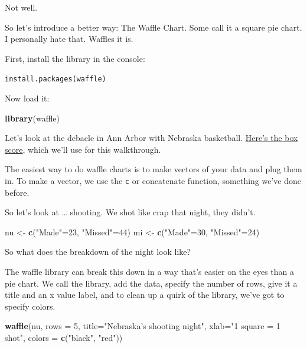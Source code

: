 \documentclass[]{book}
\newenvironment{Shaded}{\begin{snugshade}}{\end{snugshade}}
\newcommand{\KeywordTok}[1]{\textcolor[rgb]{0.13,0.29,0.53}{\textbf{#1}}}
\newcommand{\DataTypeTok}[1]{\textcolor[rgb]{0.13,0.29,0.53}{#1}}
\newcommand{\DecValTok}[1]{\textcolor[rgb]{0.00,0.00,0.81}{#1}}
\newcommand{\StringTok}[1]{\textcolor[rgb]{0.31,0.60,0.02}{#1}}
\newcommand{\NormalTok}[1]{#1}
\begin{document}
Not well.

So let's introduce a better way: The Waffle Chart. Some call it a square
pie chart. I personally hate that. Waffles it is.

First, install the library in the console:

\texttt{install.packages(\textquotesingle{}waffle\textquotesingle{})}

Now load it:

\begin{Shaded}
\begin{Highlighting}[]
\KeywordTok{library}\NormalTok{(waffle)}
\end{Highlighting}
\end{Shaded}

Let's look at the debacle in Ann Arbor with Nebraska basketball.
\href{https://www.sports-reference.com/cbb/boxscores/2019-02-28-19-michigan.html}{Here's
the box score}, which we'll use for this walkthrough.

The easiest way to do waffle charts is to make vectors of your data and
plug them in. To make a vector, we use the \texttt{c} or concatenate
function, something we've done before.

So let's look at \ldots{} shooting. We shot like crap that night, they
didn't.

\begin{Shaded}
\begin{Highlighting}[]
\NormalTok{nu <-}\StringTok{ }\KeywordTok{c}\NormalTok{(}\StringTok{"Made"}\NormalTok{=}\DecValTok{23}\NormalTok{, }\StringTok{"Missed"}\NormalTok{=}\DecValTok{44}\NormalTok{)}
\NormalTok{mi <-}\StringTok{ }\KeywordTok{c}\NormalTok{(}\StringTok{"Made"}\NormalTok{=}\DecValTok{30}\NormalTok{, }\StringTok{"Missed"}\NormalTok{=}\DecValTok{24}\NormalTok{)}
\end{Highlighting}
\end{Shaded}

So what does the breakdown of the night look like?

The waffle library can break this down in a way that's easier on the
eyes than a pie chart. We call the library, add the data, specify the
number of rows, give it a title and an x value label, and to clean up a
quirk of the library, we've got to specify colors.

\begin{Shaded}
\begin{Highlighting}[]
\KeywordTok{waffle}\NormalTok{(nu, }\DataTypeTok{rows =} \DecValTok{5}\NormalTok{, }\DataTypeTok{title=}\StringTok{"Nebraska's shooting night"}\NormalTok{, }\DataTypeTok{xlab=}\StringTok{"1 square = 1 shot"}\NormalTok{, }\DataTypeTok{colors =} \KeywordTok{c}\NormalTok{(}\StringTok{"black"}\NormalTok{, }\StringTok{"red"}\NormalTok{))}
\end{Highlighting}
\end{Shaded}
\end{document}
